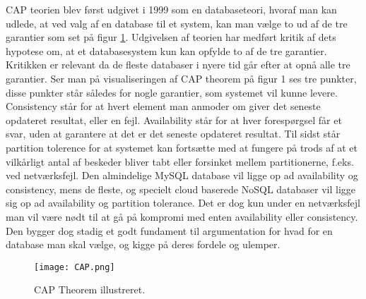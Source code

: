 CAP teorien blev først udgivet i 1999 som en databaseteori, hvoraf man kan udlede, at ved valg af en database til et system, kan man vælge to ud af de tre garantier som set på figur \ref{fig::CAP}. Udgivelsen af teorien har medført kritik af dets hypotese om, at et databasesystem kun kan opfylde to af de tre garantier. Kritikken er relevant da de fleste databaser i nyere tid går efter at opnå alle tre garantier. 
Ser man på visualiseringen af CAP theorem på figur 1 ses tre punkter, disse punkter står således for nogle garantier, som systemet vil kunne levere. Consistency står for at hvert element man anmoder om giver det seneste opdateret resultat, eller en fejl. Availability står for at hver forespørgsel får et svar, uden at garantere at det er det seneste opdateret resultat. Til sidst står partition tolerence for at systemet kan fortsætte med at fungere på trods af at et vilkårligt antal af beskeder bliver tabt eller forsinket mellem partitionerne, f.eks. ved netværksfejl. Den almindelige MySQL database vil ligge op ad availability og consistency, mens de fleste, og specielt cloud baserede NoSQL databaser vil ligge sig op ad availability og partition tolerance. Det er dog kun under en netværksfejl man vil være nødt til at gå på kompromi med enten availability eller consistency. Den bygger dog stadig et godt fundament til argumentation for hvad for en database man skal vælge, og kigge på deres fordele og ulemper.
\begin{figure}
    \centering
    \texttt{[image: CAP.png]}
    \caption{CAP Theorem illustreret.}
    \label{fig::CAP}
\end{figure}